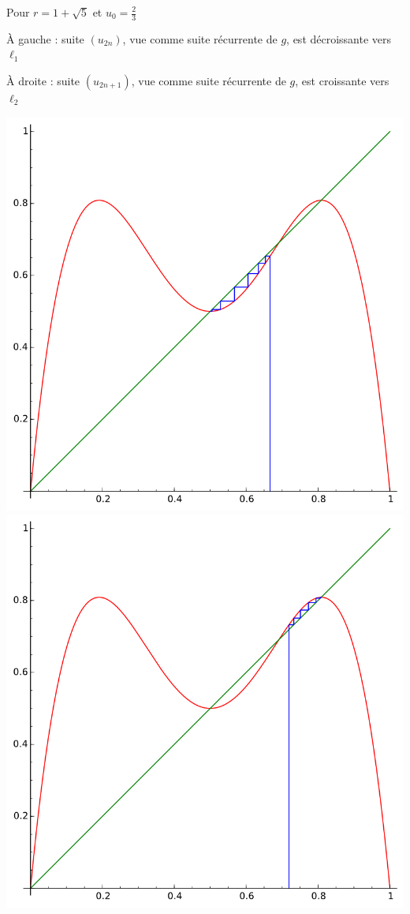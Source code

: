 \begin{frame}

Pour $r=1+\sqrt{5}$ et $u_0=\frac23$
 
    \`A gauche : suite $(u_{2n})$, vue comme suite récurrente de $g$, 
    est décroissante vers $\ell_1$
    
    \`A droite : suite $(u_{2n+1})$, vue comme suite récurrente de $g$,
    est croissante vers $\ell_2$


  \begin{center}
  \hspace*{-3em}\includegraphics[scale=0.4]{figures/chaos7}\quad 
  \includegraphics[scale=0.4]{figures/chaos8}
  \end{center}
\end{frame}


